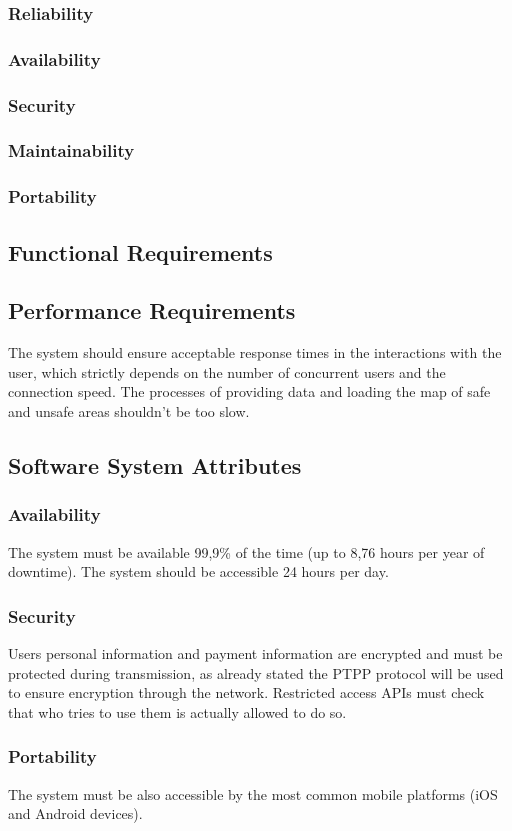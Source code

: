 \subsubsection{Reliability}
\subsubsection{Availability}
\subsubsection{Security}
\subsubsection{Maintainability}
\subsubsection{Portability}

\clearpage

\subsection{Functional Requirements}


  	
\subsection{Performance Requirements}
	The system should ensure acceptable response times in the interactions with the user, which strictly depends on the number of concurrent users and the connection speed.
\newline
The processes of providing data and loading the map of safe and unsafe areas shouldn't be too slow.
\subsection{Software System Attributes}
	\subsubsection{Availability}
	The system must be available 99,9\% of the time (up to 8,76 hours per year of downtime). The system should be accessible 24 hours per day.
	\subsubsection{Security}
	Users personal information and payment information are encrypted and must be protected during transmission, as already stated the PTPP protocol will be used to ensure encryption through the network.
	Restricted access APIs must check that who tries to use them is actually allowed to do so.
	\subsubsection{Portability}
	The system must be also accessible by the most common mobile platforms (iOS and Android devices).

